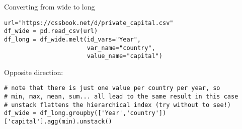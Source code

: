 \begin{frame}[fragile]{Converting from wide to long}

\begin{verbatim}
url="https://cssbook.net/d/private_capital.csv"
df_wide = pd.read_csv(url)
df_long = df_wide.melt(id_vars="Year", 
                       var_name="country", 
                       value_name="capital")
\end{verbatim}

Opposite direction:
\begin{verbatim}
# note that there is just one value per country per year, so
# min, max, mean, sum... all lead to the same result in this case
# unstack flattens the hierarchical index (try without to see!)
df_wide = df_long.groupby(['Year','country'])['capital'].agg(min).unstack()
\end{verbatim}
\end{frame}

